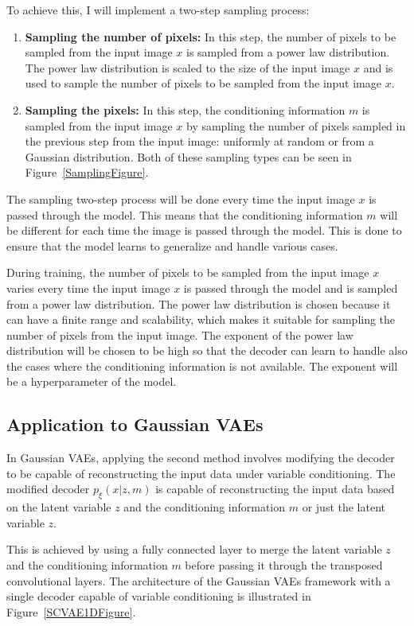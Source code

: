 To achieve this, I will implement a two-step sampling process:

\begin{enumerate}
    \item \textbf{Sampling the number of pixels:} In this step, the number of pixels to be sampled from the input image $x$ is sampled from a power law distribution. The power law distribution is scaled to the size of the input image $x$ and is used to sample the number of pixels to be sampled from the input image $x$.
    \item \textbf{Sampling the pixels:} In this step, the conditioning information $m$ is sampled from the input image $x$ by sampling the number of pixels sampled in the previous step from the input image: uniformly at random or from a Gaussian distribution. Both of these sampling types can be seen in Figure~\ref{SamplingFigure}.
\end{enumerate}

The sampling two-step process will be done every time the input image $x$ is passed through the model. This means that the conditioning information $m$ will be different for each time the image is passed through the model. This is done to ensure that the model learns to generalize and handle various cases.

During training, the number of pixels to be sampled from the input image $x$ varies every time the input image $x$ is passed through the model and is sampled from a power law distribution.
The power law distribution is chosen because it can have a finite range and scalability, which makes it suitable for sampling the number of pixels from the input image. The exponent of the power law distribution will be chosen to be high so that the decoder can learn to handle also the cases where the conditioning information is not available. The exponent will be a hyperparameter of the model.


\subsection{Application to Gaussian VAEs}

In Gaussian VAEs, applying the second method involves modifying the decoder to
be capable of reconstructing the input data under variable conditioning. The
modified decoder $p_\xi(x|z,m)$ is capable of reconstructing the input data
based on the latent variable $z$ and the conditioning information $m$ or just
the latent variable $z$.

This is achieved by using a fully connected layer to merge the latent variable
$z$ and the conditioning information $m$ before passing it through the
transposed convolutional layers. The architecture of the Gaussian VAEs
framework with a single decoder capable of variable conditioning is illustrated
in Figure~\ref{SCVAE1DFigure}.

